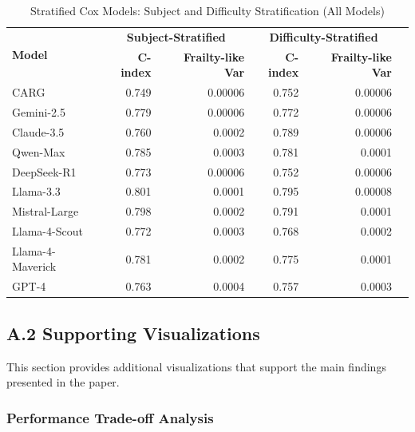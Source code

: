 \documentclass[letterpaper]{article}
\begin{document}
\begin{table}[ht]
\centering
\caption{Stratified Cox Models: Subject and Difficulty Stratification (All Models)}
\label{tab:stratified_results_detailed}
\begin{tabular}{lrrrrr}
\toprule
\multirow{2}{*}{\textbf{Model}} & \multicolumn{2}{c}{\textbf{Subject-Stratified}} & \multicolumn{2}{c}{\textbf{Difficulty-Stratified}} \\
\cmidrule(lr){2-3} \cmidrule(lr){4-5}
& \textbf{C-index} & \textbf{Frailty-like Var} & \textbf{C-index} & \textbf{Frailty-like Var} \\
\midrule
CARG & 0.749 & 0.00006 & 0.752 & 0.00006 \\
Gemini-2.5 & 0.779 & 0.00006 & 0.772 & 0.00006 \\
Claude-3.5 & 0.760 & 0.0002 & 0.789 & 0.00006 \\
Qwen-Max & 0.785 & 0.0003 & 0.781 & 0.0001 \\
DeepSeek-R1 & 0.773 & 0.00006 & 0.752 & 0.00006 \\
Llama-3.3 & 0.801 & 0.0001 & 0.795 & 0.00008 \\
Mistral-Large & 0.798 & 0.0002 & 0.791 & 0.0001 \\
Llama-4-Scout & 0.772 & 0.0003 & 0.768 & 0.0002 \\
Llama-4-Maverick & 0.781 & 0.0002 & 0.775 & 0.0001 \\
GPT-4 & 0.763 & 0.0004 & 0.757 & 0.0003 \\
\bottomrule
\end{tabular}
\end{table}

\subsection*{A.2 Supporting Visualizations}

This section provides additional visualizations that support the main findings presented in the paper.

\subsubsection*{Performance Trade-off Analysis}
\end{document}
